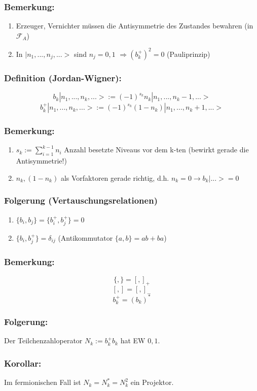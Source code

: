 \documentclass[twoside,a4paper]{scrartcl}
\renewcommand{\1}{\mathds{1}}
\newcommand{\Ra}{\Rightarrow}
\newcommand{\ra}{\rightarrow}
\newcommand{\F}{\mathcal{F}}
\begin{document}
\subsubsection*{Bemerkung:}
\begin{enumerate}
\item Erzeuger, Vernichter müssen die Antisymmetrie des Zustandes bewahren (in $\F_A$)
\item In $|n_1,...,n_j,...>$ sind $n_j=0,1$ $\Ra (b_k^+)^2=0$ (Pauliprinzip)
\end{enumerate}
\subsubsection*{Definition (Jordan-Wigner):}
$$b_k|n_1,...,n_k,...>:=(-1)^{s_k} n_k|n_1,...,n_k-1,...>$$
$$b_k^+|n_1,...,n_k,...>:=(-1)^{s_k} (1-n_k)|n_1,...,n_k+1,...>$$
\subsubsection*{Bemerkung:}
\begin{enumerate}
\item $s_k:=\sum_{i=1}^{k-1} n_i$ Anzahl besetzte Niveaus vor dem k-ten (bewirkt gerade die Antisymmetrie!)
\item $n_k,(1-n_k)$ als Vorfaktoren gerade richtig, d.h. $n_k=0 \ra b_k|...>=0$
\end{enumerate}
\subsubsection*{Folgerung (Vertauschungsrelationen)} 
 \begin{enumerate}
\item $\{b_i,b_{j}\}=\{b_i^+,b_{j}^+\}=0$
\item $\{b_i,b_j^+\}=\delta_{ij}$ (Antikommutator $\{a,b\}=ab+ba$)
\end{enumerate}
\subsubsection*{Bemerkung:}
$$\{,\}=[,]_+$$
$$[,]=[,]_-$$
$$b_k^+=(b_k)^*$$
\subsubsection*{Folgerung:}
Der Teilchenzahloperator $N_k:=b_k^+b_k$ hat EW $0,1$.
\subsubsection*{Korollar:}
Im fermionischen Fall ist $N_k=N_k^*=N_k^2$ ein Projektor.
\end{document}
